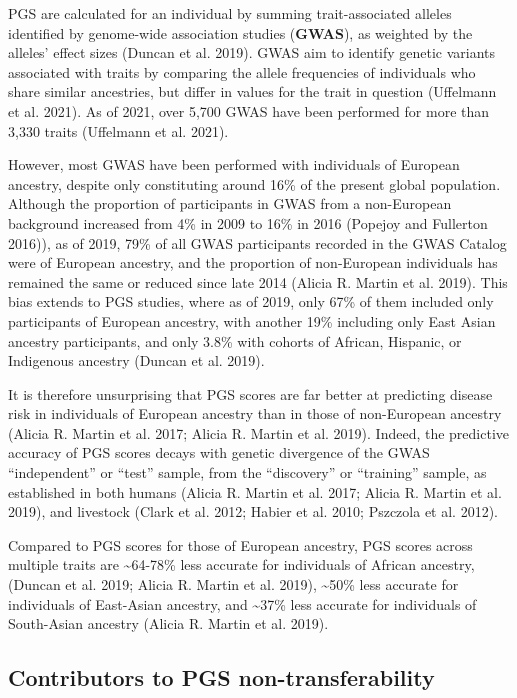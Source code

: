 \documentclass[
]{book}
\begin{document}
PGS are calculated for an individual by summing trait-associated alleles identified by genome-wide association studies (\textbf{GWAS}), as weighted by the alleles' effect sizes (Duncan et al. 2019). GWAS aim to identify genetic variants associated with traits by comparing the allele frequencies of individuals who share similar ancestries, but differ in values for the trait in question (Uffelmann et al. 2021). As of 2021, over 5,700 GWAS have been performed for more than 3,330 traits (Uffelmann et al. 2021).

However, most GWAS have been performed with individuals of European ancestry, despite only constituting around 16\% of the present global population. Although the proportion of participants in GWAS from a non-European background increased from 4\% in 2009 to 16\% in 2016 (Popejoy and Fullerton 2016)), as of 2019, 79\% of all GWAS participants recorded in the GWAS Catalog were of European ancestry, and the proportion of non-European individuals has remained the same or reduced since late 2014 (Alicia R. Martin et al. 2019). This bias extends to PGS studies, where as of 2019, only 67\% of them included only participants of European ancestry, with another 19\% including only East Asian ancestry participants, and only 3.8\% with cohorts of African, Hispanic, or Indigenous ancestry (Duncan et al. 2019).

It is therefore unsurprising that PGS scores are far better at predicting disease risk in individuals of European ancestry than in those of non-European ancestry (Alicia R. Martin et al. 2017; Alicia R. Martin et al. 2019). Indeed, the predictive accuracy of PGS scores decays with genetic divergence of the GWAS ``independent'' or ``test'' sample, from the ``discovery'' or ``training'' sample, as established in both humans (Alicia R. Martin et al. 2017; Alicia R. Martin et al. 2019), and livestock (Clark et al. 2012; Habier et al. 2010; Pszczola et al. 2012).

Compared to PGS scores for those of European ancestry, PGS scores across multiple traits are \textasciitilde64-78\% less accurate for individuals of African ancestry, (Duncan et al. 2019; Alicia R. Martin et al. 2019), \textasciitilde50\% less accurate for individuals of East-Asian ancestry, and \textasciitilde37\% less accurate for individuals of South-Asian ancestry (Alicia R. Martin et al. 2019).

\hypertarget{contributors-to-pgs-non-transferability-1}{%
\subsection{Contributors to PGS non-transferability}\label{contributors-to-pgs-non-transferability-1}}
\end{document}
